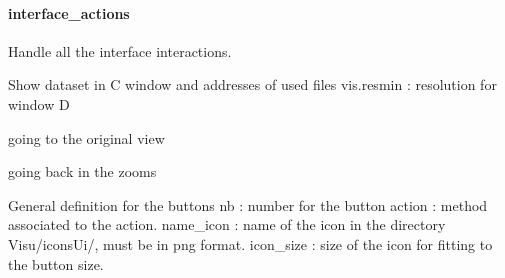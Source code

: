 \documentclass[letterpaper,10pt,openany,oneside]{sphinxmanual}
\begin{document}
\paragraph{interface\_actions}
\label{rst/visu2d:module-Visu.interface_actions}\label{rst/visu2d:interface-actions}

\begin{fulllineitems}
\label{rst/visu2d:Visu.interface_actions.INTERACT}
Handle all the interface interactions.

\begin{fulllineitems}
\label{rst/visu2d:Visu.interface_actions.INTERACT.afffile}
Show dataset in C window and addresses of used files
vis.resmin : resolution for window D

\end{fulllineitems}


\begin{fulllineitems}
\label{rst/visu2d:Visu.interface_actions.INTERACT.backhome}
going to the original view

\end{fulllineitems}


\begin{fulllineitems}
\label{rst/visu2d:Visu.interface_actions.INTERACT.backzoo}
going back in the zooms

\end{fulllineitems}


\begin{fulllineitems}
\label{rst/visu2d:Visu.interface_actions.INTERACT.button}
General definition for the buttons
nb : number for the button
action : method associated to the action.
name\_icon : name of the icon in the directory Visu/iconsUi/, must be in png format.
icon\_size : size of the icon for fitting to the button size.


\end{fulllineitems}
\end{fulllineitems}
\end{document}
